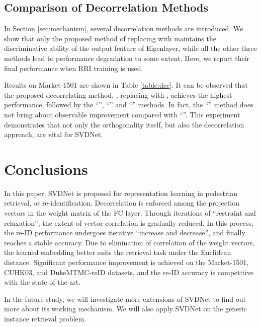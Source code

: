 \documentclass[10pt,twocolumn,letterpaper]{article}
\begin{document}
\subsection{Comparison of Decorrelation Methods} In Section \ref{sec:mechanism}, several decorrelation methods are introduced. 
We show that only the proposed method of replacing  with  maintains the discriminative ability of the output feature of Eigenlayer, while all the other three methods lead to performance degradation to some extent. Here, we report their final performance when RRI training is used. 


Results on Market-1501 are shown in Table \ref{table:dec}. It can be observed that the proposed decorrelating method, \ie, replacing  with , achieves the highest performance, followed by the ``'', ``'' and ``'' methods. In fact, the ``'' method  does not bring about  observable improvement compared with ``''. This experiment demonstrates that not only the orthogonality itself, but also the decorrelation approach, are vital for SVDNet.

\section{Conclusions}
In this paper, SVDNet is proposed for representation learning in pedestrian retrieval, or re-identification. Decorrelation is enforced among the projection vectors in the weight matrix of the FC layer. Through iterations of ``restraint and relaxation'', the extent of vector correlation is gradually reduced. In this process, the re-ID performance undergoes iterative ``increase and decrease'', and finally reaches a stable accuracy. Due to elimination of correlation of the weight vectors, the learned embedding better suits the retrieval task under the Euclidean distance. Significant performance improvement is achieved on the Market-1501, CUHK03, and DukeMTMC-reID datasets, and the re-ID accuracy is competitive with the state of the art.

In the future study, we will investigate more extensions of SVDNet to find out more about its working mechanism. We will also apply SVDNet on the generic instance retrieval problem.



{\small


}
\end{document}

